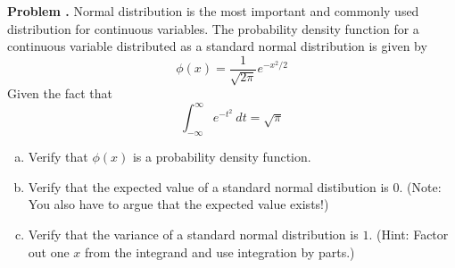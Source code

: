 \documentclass[11pt,letterpaper]{article}
\newcounter{problem}
\newcommand{\problem}{
	\stepcounter{problem}%
	\noindent \textbf{Problem \theproblem. }%
}
\begin{document}
\problem Normal distribution is the most important and commonly used distribution for continuous variables.  The probability density function for a continuous variable distributed as a standard normal distribution is given by
\[\phi(x) = \frac{1}{\sqrt{2\pi}} e^{-x^2/2}\]
Given the fact that 
\[\int_{-\infty}^{\infty} e^{-t^2}~dt = \sqrt{\pi}\]
\begin{enumerate}[a)]
    \item Verify that $\phi(x)$ is a probability density function.
    \item Verify that the expected value of a standard normal distibution is $0$.  (Note: You also have to argue that the expected value exists!)
    \item Verify that the variance of a standard normal distribution is $1$. (Hint: Factor out one $x$ from the integrand and use integration by parts.)
\end{enumerate}
\end{document}
